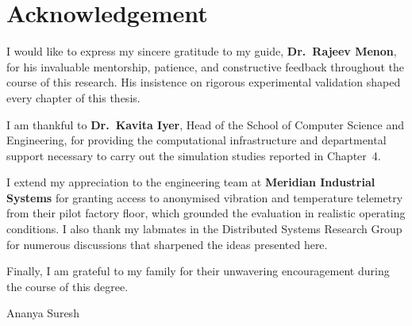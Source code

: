 \chapter*{Acknowledgement}
\thispagestyle{plain}

I would like to express my sincere gratitude to my guide, \textbf{Dr.\ Rajeev Menon}, for
his invaluable mentorship, patience, and constructive feedback throughout the course of
this research. His insistence on rigorous experimental validation shaped every chapter of
this thesis.

I am thankful to \textbf{Dr.\ Kavita Iyer}, Head of the School of Computer Science and
Engineering, for providing the computational infrastructure and departmental support
necessary to carry out the simulation studies reported in Chapter~4.

I extend my appreciation to the engineering team at \textbf{Meridian Industrial Systems}
for granting access to anonymised vibration and temperature telemetry from their pilot
factory floor, which grounded the evaluation in realistic operating conditions. I also
thank my labmates in the Distributed Systems Research Group for numerous discussions that
sharpened the ideas presented here.

Finally, I am grateful to my family for their unwavering encouragement during the course
of this degree.

\vspace{0.4in}
\hfill Ananya Suresh

